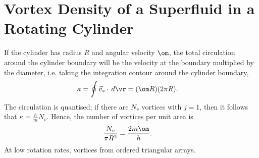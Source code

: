 \documentclass[qo.tex]{subfiles}
\begin{document}
\section{Vortex Density of a Superfluid in a Rotating Cylinder}
If the cylinder has radius $R$ and angular velocity $\om$, the total circulation around the cylinder boundary will be the velocity at the boundary multiplied by the diameter, i.e. taking the integration contour around the cylinder boundary,
\begin{align}
    \kappa &= \oint \vec{v}_s\cdot\,d\vr = (\om R)(2\pi R).
\end{align}
The circulation is quantised; if there are $N_v$ vortices with $j=1$, then it follows that $\kappa=\frac{h}{m}N_v$.
Hence, the number of vortices per unit area is
\begin{align}
    \frac{N_v}{\pi R^2} &= \frac{2m\om}{h}.
\end{align}
At low rotation rates, vortices from ordered triangular arrays.
\end{document}
